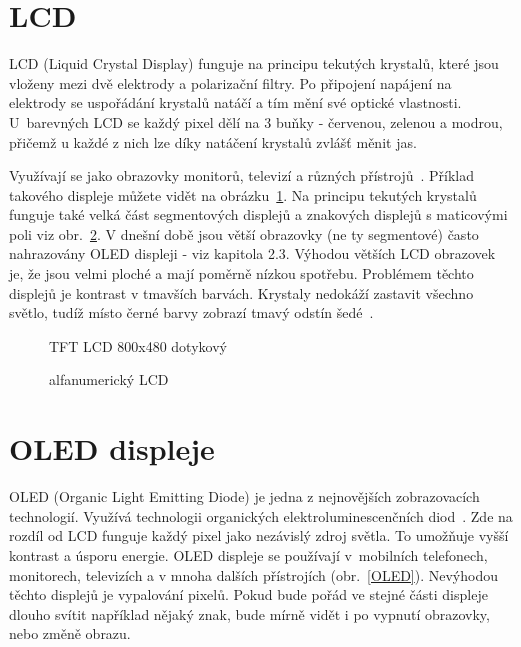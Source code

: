     \section{LCD}
        LCD (Liquid Crystal Display) funguje na principu tekutých krystalů, které jsou vloženy mezi dvě elektrody a polarizační filtry. Po připojení napájení na elektrody se uspořádání krystalů natáčí a tím mění své optické vlastnosti. U~barevných LCD se každý pixel dělí na 3 buňky - červenou, zelenou a modrou, přičemž u každé z nich lze díky natáčení krystalů zvlášť měnit jas.
        
        Využívají se jako obrazovky monitorů, televizí a různých přístrojů~\cite{DisplejeLCD}. Příklad takového displeje můžete vidět na obrázku~\ref{TFTLCD}. Na principu tekutých krystalů funguje také velká část segmentových displejů a znakových displejů s maticovými poli viz obr.~\ref{LCDalfn}. V dnešní době jsou větší obrazovky (ne ty segmentové) často nahrazovány OLED displeji - viz kapitola 2.3. Výhodou větších LCD obrazovek je, že jsou velmi ploché a mají poměrně nízkou spotřebu. Problémem těchto displejů je kontrast v tmavších barvách. Krystaly nedokáží zastavit všechno světlo, tudíž místo černé barvy zobrazí tmavý odstín šedé~\cite{ZobrazovaciGrafickaZarizeni}.

        \begin{figure}[htb]
        \caption{TFT LCD 800x480 dotykový~\cite{TFTLCDdisplej}}
        \label{TFTLCD}
        \end{figure}

        \begin{figure}[htb]
        \caption{alfanumerický LCD~\cite{DisplejeLCD}}
        \label{LCDalfn}
        \end{figure}

    \clearpage

    \section{OLED displeje}
        OLED (Organic Light Emitting Diode) je jedna z nejnovějších zobrazovacích technologií. Využívá technologii organických elektroluminescenčních diod~\cite{ZobrazovaciGrafickaZarizeni}. Zde na rozdíl od LCD funguje každý pixel jako nezávislý zdroj světla. To umožňuje vyšší kontrast a úsporu energie. OLED displeje se používají v~mobilních telefonech, monitorech, televizích a v mnoha dalších přístrojích (obr.~\ref{OLED}). Nevýhodou těchto displejů je vypalování pixelů. Pokud bude pořád ve stejné části displeje dlouho svítit například nějaký znak, bude mírně vidět i po vypnutí obrazovky, nebo změně obrazu.

